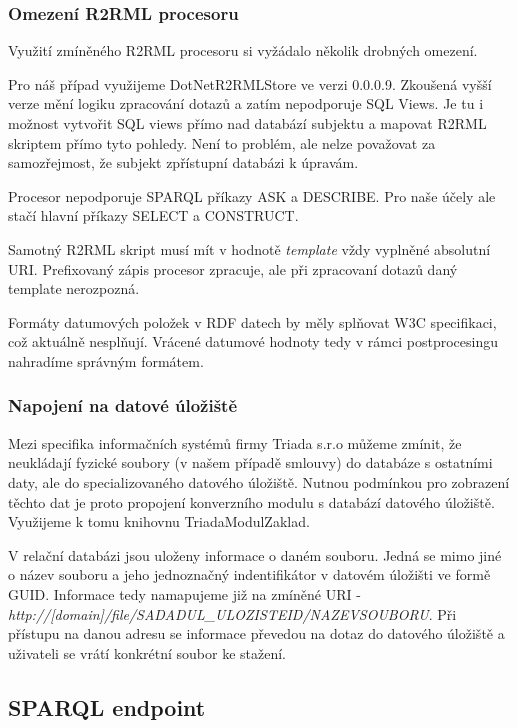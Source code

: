 \subsubsection*{Omezení R2RML procesoru}

Využití zmíněného R2RML procesoru si vyžádalo několik drobných omezení. 

Pro náš případ využijeme DotNetR2RMLStore ve verzi 0.0.0.9. Zkoušená vyšší verze mění logiku zpracování dotazů a zatím nepodporuje SQL Views. Je tu i možnost vytvořit SQL views přímo nad databází subjektu a mapovat R2RML skriptem přímo tyto pohledy. Není to problém, ale nelze považovat za samozřejmost, že subjekt zpřístupní databázi k úpravám. 

Procesor nepodporuje SPARQL příkazy ASK a DESCRIBE. Pro naše účely ale stačí hlavní příkazy SELECT a CONSTRUCT.

Samotný R2RML skript musí mít v hodnotě \textit{template} vždy vyplněné absolutní URI. Prefixovaný zápis procesor zpracuje, ale při zpracovaní dotazů daný template nerozpozná.

Formáty datumových položek v RDF datech by měly splňovat W3C specifikaci, což aktuálně nesplňují. Vrácené datumové hodnoty tedy v rámci postprocesingu nahradíme správným formátem\cite{datetime}. 

\subsubsection{Napojení na datové úložiště}

Mezi specifika informačních systémů firmy Triada s.r.o můžeme zmínit, že neukládají fyzické soubory (v našem případě smlouvy) do databáze s ostatními daty, ale do specializovaného datového úložiště. Nutnou podmínkou pro zobrazení těchto dat je proto propojení konverzního modulu s databází datového úložiště. Využijeme k tomu knihovnu TriadaModulZaklad.

V relační databázi jsou uloženy informace o daném souboru. Jedná se mimo jiné o název souboru a jeho jednoznačný indentifikátor v datovém úložišti ve formě GUID. Informace tedy namapujeme již na zmíněné URI -\\\textit{http://[domain]/file/{SADADUL\_ULOZISTEID}/{NAZEVSOUBORU}}. Při přístupu na danou adresu se informace převedou na dotaz do datového úložiště a uživateli se vrátí konkrétní soubor ke stažení.

\subsection{SPARQL endpoint}


